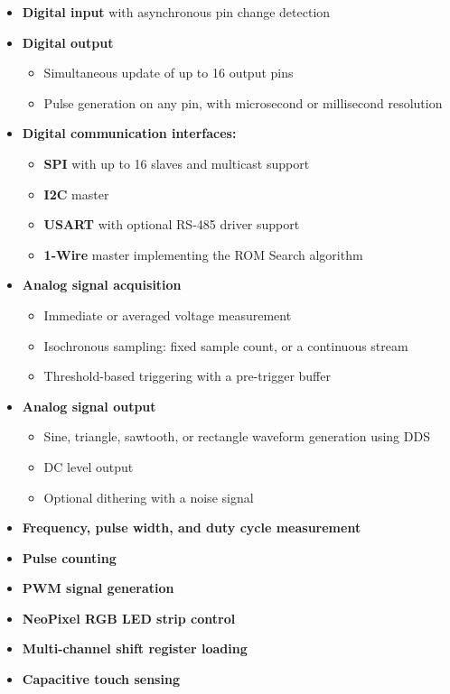 \begin{itemize}[itemsep=1pt]
	\item \textbf{Digital input} with asynchronous pin change detection
	\item \textbf{Digital output} 
		\begin{itemize}
			\item Simultaneous update of up to 16 output pins
			\item Pulse generation on any pin, with microsecond or millisecond resolution
		\end{itemize}	
	\item \textbf{Digital communication interfaces:}
\begin{itemize}
\item \textbf{\gls{SPI}} with up to 16 slaves and multicast support
\item \textbf{\gls{I2C}} master
\item \textbf{\gls{USART}} with optional RS-485 driver support
\item \textbf{1-Wire} master implementing the \gls{ROM} Search algorithm
\end{itemize}
	\item \textbf{Analog signal acquisition}
		\begin{itemize}
			\item Immediate or averaged voltage measurement
			\item Isochronous sampling: fixed sample count, or a continuous stream
			\item Threshold-based triggering with a pre-trigger buffer
		\end{itemize}
	\item \textbf{Analog signal output}
		\begin{itemize}
			\item Sine, triangle, sawtooth, or rectangle waveform generation using \gls{DDS}
			\item \gls{DC} level output
			\item Optional dithering with a noise signal
		\end{itemize}
	\item \textbf{Frequency, pulse width, and duty cycle measurement}
	\item \textbf{Pulse counting}
	\item \textbf{\gls{PWM} signal generation}	
	\item \textbf{NeoPixel RGB \gls{LED} strip control}
	\item \textbf{Multi-channel shift register loading}
	\item \textbf{Capacitive touch sensing}
\end{itemize}

